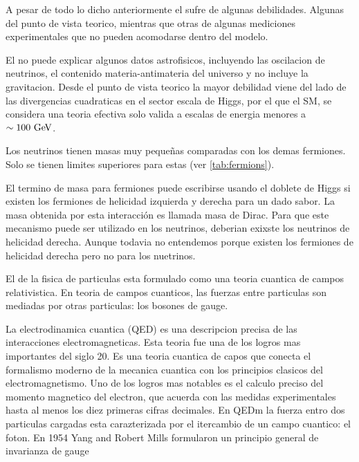 A pesar de todo lo dicho anteriormente el {\SM} sufre de algunas debilidades. Algunas del
punto de vista teorico, mientras que otras de algunas mediciones experimentales que no pueden
acomodarse dentro del modelo.

El {\SM} no puede explicar algunos datos astrofisicos, incluyendo
las oscilacion de neutrinos, el contenido materia-antimateria del
universo y no incluye la gravitacion. Desde el punto de vista
teorico la mayor debilidad viene del lado de las divergencias
cuadraticas en el sector escala de Higgs, por el que el SM, se
considera una teoria efectiva solo valida a escalas de energia
menores a $\sim 100 \gev$.

Los neutrinos tienen masas muy peque\~nas comparadas con los demas fermiones. Solo se tienen
limites superiores para estas (ver {\tab} \ref{tab:fermions}).

El termino de masa para fermiones puede escribirse usando el doblete de Higgs si existen
los fermiones de helicidad izquierda y derecha para un dado sabor. La masa obtenida por
esta interacci\'on es llamada masa de Dirac. Para que este mecanismo puede ser utilizado
en los neutrinos, deberian exixste los neutrinos de helicidad derecha. Aunque todavia
no entendemos porque existen los fermiones de helicidad derecha pero no para los nuetrinos.























El {\SM} de la fisica de particulas esta formulado como una
teoria cuantica de campos relativistica.
En teoria de campos cuanticos, las fuerzas entre particulas
son mediadas por otras particulas: los bosones de gauge.

La electrodinamica cuantica (QED) es una descripcion precisa
de las interacciones electromagneticas. Esta teoria fue una de
los logros mas importantes del siglo 20. Es una teoria cuantica
de capos que conecta el formalismo moderno de la mecanica cuantica
con los principios clasicos del electromagnetismo. Uno de los
logros mas notables es el calculo preciso del momento magnetico
del electron, que acuerda con las medidas experimentales hasta
al menos los diez primeras cifras decimales. En QEDm la fuerza
entro dos particulas cargadas esta carazterizada por el itercambio
de un campo cuantico: el foton. En 1954 Yang and Robert Mills
formularon un principio general de invarianza de gauge

